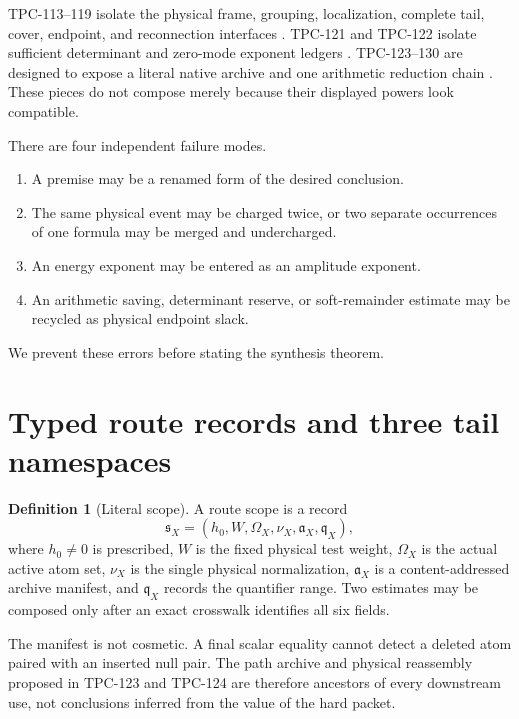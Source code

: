 \documentclass[11pt]{article}
\theoremstyle{definition}
\newtheorem{definition}[theorem]{Definition}
\theoremstyle{remark}
\begin{document}
TPC-113--119 isolate the physical frame, grouping, localization,
complete tail, cover, endpoint, and reconnection interfaces
\citep{WangTPC113,WangTPC114,WangTPC115,WangTPC116,WangTPC117,
WangTPC118,WangTPC119}.  TPC-121 and TPC-122 isolate sufficient
determinant and zero-mode exponent ledgers
\citep{WangTPC121,WangTPC122}.  TPC-123--130 are designed to expose a
literal native archive and one arithmetic reduction chain
\citep{WangTPC123,WangTPC124,WangTPC125,WangTPC126,WangTPC127,
WangTPC128,WangTPC129,WangTPC130}.  These pieces do not compose
merely because their displayed powers look compatible.

There are four independent failure modes.
\begin{enumerate}[leftmargin=2em]
\item A premise may be a renamed form of the desired conclusion.
\item The same physical event may be charged twice, or two separate
  occurrences of one formula may be merged and undercharged.
\item An energy exponent may be entered as an amplitude exponent.
\item An arithmetic saving, determinant reserve, or soft-remainder
  estimate may be recycled as physical endpoint slack.
\end{enumerate}
We prevent these errors before stating the synthesis theorem.

\section{Typed route records and three tail namespaces}

\begin{definition}[Literal scope]
\label{def:scope}
A route scope is a record
\[
 \mathfrak s_X=(h_0,W,\Omega_X,\nu_X,\mathfrak a_X,\mathfrak q_X),
\]
where \(h_0\ne0\) is prescribed, \(W\) is the fixed physical test
weight, \(\Omega_X\) is the actual active atom set, \(\nu_X\) is the
single physical normalization, \(\mathfrak a_X\) is a content-addressed
archive manifest, and \(\mathfrak q_X\) records the quantifier range.
Two estimates may be composed only after an exact crosswalk identifies
all six fields.
\end{definition}

The manifest is not cosmetic.  A final scalar equality cannot detect
a deleted atom paired with an inserted null pair.  The path archive
and physical reassembly proposed in TPC-123 and TPC-124 are therefore
ancestors of every downstream use, not conclusions inferred from the
value of the hard packet.
\end{document}
